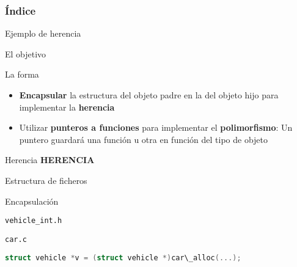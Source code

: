 \documentclass{mybeamer}
\institute{
	{\textsl{\large Tema 12}}
	\\[1em]
	\textbf{\Large Objetos (II): Herencia}
}
\begin{document}
\begin{frame}
\titlepage
\end{frame}

\begin{frame}
\frametitle{Índice}
	\tableofcontents
\end{frame}

\begin{framesec}[Ejemplo]{Ejemplo de herencia}
	\centering
\end{framesec}

\begin{framesec}{El objetivo}
	
	
\end{framesec}

\begin{framesec}{La forma}
	\begin{itemize}
		\item \textbf{Encapsular} la estructura del objeto padre en la
			del objeto hijo para implementar la \textbf{herencia}
		\item Utilizar \textbf{punteros a funciones} para implementar el
			\textbf{polimorfismo}: Un puntero guardará una función u
			otra en función del tipo de objeto
	\end{itemize}
\end{framesec}

\begin{framesec}{Herencia}
	\centering
	\bfseries \Huge HERENCIA
\end{framesec}

\begin{framesubsec}{Estructura de ficheros}
\end{framesubsec}

\begin{framesubsec}{Encapsulación}
	\only<1| handout:1> {
		\texttt{vehicle\_int.h}
		
		\texttt{car.c}
		
	}
	 {
		\vspace{2em}
		\lstinline[language=C]|struct vehicle *v = (struct vehicle *)car\_alloc(...);|
	}
\end{framesubsec}
\end{document}
